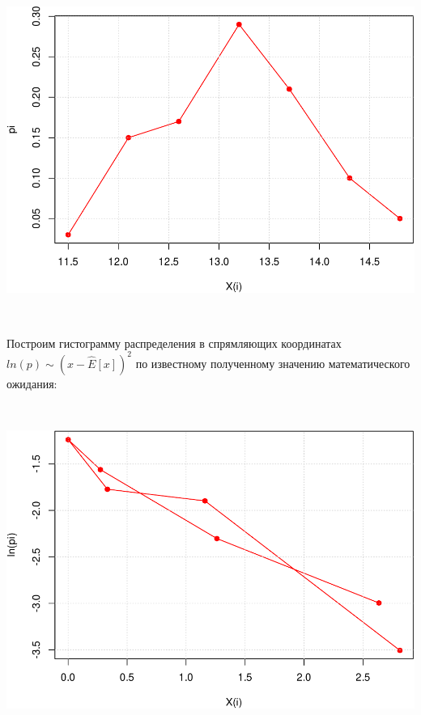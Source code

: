 \documentclass[
  14,
]{article}
\newenvironment{Shaded}{\begin{snugshade}}{\end{snugshade}}
\newcommand{\AttributeTok}[1]{\textcolor[rgb]{0.77,0.63,0.00}{#1}}
\newcommand{\DecValTok}[1]{\textcolor[rgb]{0.00,0.00,0.81}{#1}}
\newcommand{\FloatTok}[1]{\textcolor[rgb]{0.00,0.00,0.81}{#1}}
\newcommand{\FunctionTok}[1]{\textcolor[rgb]{0.00,0.00,0.00}{#1}}
\newcommand{\NormalTok}[1]{#1}
\newcommand{\SpecialCharTok}[1]{\textcolor[rgb]{0.00,0.00,0.00}{#1}}
\newcommand{\StringTok}[1]{\textcolor[rgb]{0.31,0.60,0.02}{#1}}
\begin{document}
\begin{center}\includegraphics[width=0.75\linewidth]{Prac3_files/figure-latex/unnamed-chunk-19-1} \end{center}

\(\ \)

Построим гистограмму распределения в спрямляющих координатах
\(ln(p) \sim (x - \hat{E}[x])^2\) по известному полученному значению
математического ожидания:

\(\ \)

\begin{Shaded}
\end{Shaded}

\begin{center}\includegraphics[width=0.75\linewidth]{Prac3_files/figure-latex/unnamed-chunk-20-1} \end{center}
\end{document}
